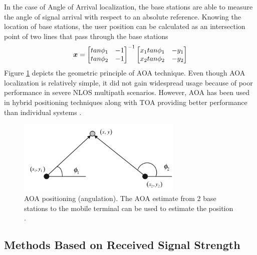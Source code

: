 In the case of Angle of Arrival localization, the base stations are able to measure the angle of signal arrival with respect to an absolute reference. 
Knowing the location of base stations, the user position can be calculated as an intersection point of two lines that pass through the base stations \cite{Dempster}
\begin{equation}
\nonumber
\mbox{\boldmath$x$} = \begin{bmatrix}
tan\phi_1 & -1 \\
tan\phi_2 & -1
\end{bmatrix}^{-1} \begin{bmatrix}
x_1 tan\phi_1 & -y_1 \\
x_2 tan\phi_2 & -y_2
\end{bmatrix}
\end{equation}
Figure \ref{fig:aoa} depicts the geometric principle of AOA technique. Even though AOA localization is relatively simple, it did not gain widespread usage because of poor performance in severe NLOS multipath scenarios. However, AOA has been used in hybrid positioning techniques along with TOA providing better performance than individual systems \cite{ChangChang}.  


\begin{figure}[h]
\centering
\includegraphics[width=0.7\textwidth]{figures/angle_of_arrival.png}
\caption{AOA positioning (angulation). The AOA estimate from 2 base stations to the mobile terminal can be used to estimate the position \cite{GeoLoc}.}
\label{fig:aoa}
\end{figure}


\subsection{Methods Based on Received Signal Strength}

